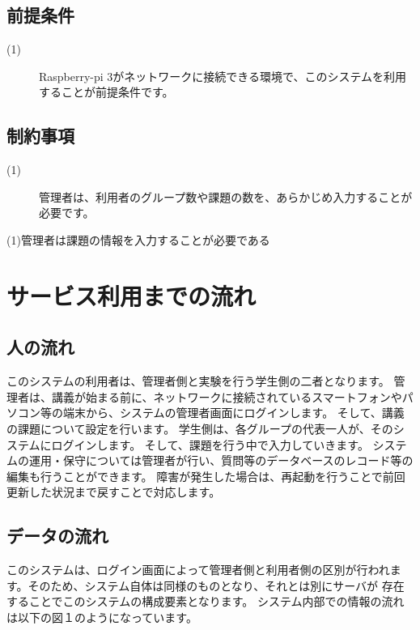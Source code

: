 \documentclass[a4j,titlepage]{ujarticle}
\begin{document}
\subsection{前提条件}
\begin{description}
\item[(1)]Raspberry-pi 3がネットワークに接続できる環境で、このシステムを利用することが前提条件です。
\end{description}

\subsection{制約事項}
\begin{description}
\item[(1)]管理者は、利用者のグループ数や課題の数を、あらかじめ入力することが必要です。
\end{description}

(1)管理者は課題の情報を入力することが必要である

\section{サービス利用までの流れ}
\subsection{人の流れ}
このシステムの利用者は、管理者側と実験を行う学生側の二者となります。 %
管理者は、講義が始まる前に、ネットワークに接続されているスマートフォンやパソコン等の端末から、システムの管理者画面にログインします。
そして、講義の課題について設定を行います。
学生側は、各グループの代表一人が、そのシステムにログインします。
そして、課題を行う中で入力していきます。 %
システムの運用・保守については管理者が行い、質問等のデータベースのレコード等の編集も行うことができます。 %
障害が発生した場合は、再起動を行うことで前回更新した状況まで戻すことで対応します。 %


\subsection{データの流れ}
このシステムは、ログイン画面によって管理者側と利用者側の区別が行われます。そのため、システム自体は同様のものとなり、それとは別にサーバが %
存在することでこのシステムの構成要素となります。
システム内部での情報の流れは以下の図１のようになっています。 %
\end{document}
